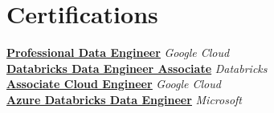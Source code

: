 \documentclass[letterpaper,11pt]{article}
\begin{document}
\vspace{-5pt}
\section{Certifications}
\begin{itemize}[leftmargin=0.15in, label={}]
    \small{
    \item{
        \textbf{\href{https://www.credly.com/badges/9e3dd3b9-698d-48d5-b0f4-f6bc1cd1ac80/public_url}{\underline{Professional Data Engineer}}} \hfill \textit{Google Cloud} \\
        \textbf{\href{https://credentials.databricks.com/6b76cb8f-07f8-49f5-ac18-f53eea4fe1de#acc.rcBozdJk}{\underline{Databricks Data Engineer Associate}}} \hfill \textit{Databricks} \\
        \textbf{\href{https://www.credly.com/badges/1f316bcd-9054-4c62-95f2-ad9981a0c87c/public_url}{\underline{Associate Cloud Engineer}}} \hfill \textit{Google Cloud} \\
        \textbf{\href{https://learn.microsoft.com/api/credentials/share/en-us/pvcodes/9D49A010F0545E8B?}{\underline{Azure Databricks Data Engineer}}} \hfill \textit{Microsoft} \\
    }}
\end{itemize}
\end{document}
